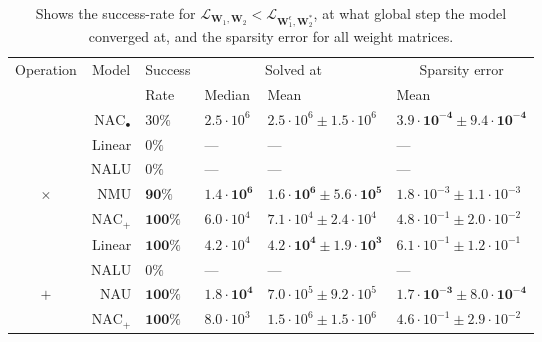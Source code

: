 \begin{table}[H]

\caption{\label{tab:function-task-static-defaults}Shows the success-rate for $\mathcal{L}_{\mathbf{W}_1, \mathbf{W}_2} < \mathcal{L}_{\mathbf{W}_1^\epsilon, \mathbf{W}_2^*}$, at what global step the model converged at, and the sparsity error for all weight matrices.}
\centering
\begin{tabular}{crllll}
\toprule
\multicolumn{1}{c}{Operation} & \multicolumn{1}{c}{Model} & \multicolumn{1}{c}{Success} & \multicolumn{2}{c}{Solved at} & \multicolumn{1}{c}{Sparsity error} \\
\cmidrule(l{3pt}r{3pt}){1-1} \cmidrule(l{3pt}r{3pt}){2-2} \cmidrule(l{3pt}r{3pt}){3-3} \cmidrule(l{3pt}r{3pt}){4-5} \cmidrule(l{3pt}r{3pt}){6-6}
 &  & Rate & Median & Mean & Mean\\
\midrule
 & $\mathrm{NAC}_{\bullet}$ & $30\%$ & $2.5 \cdot 10^{6}$ & $2.5 \cdot 10^{6} \pm 1.5 \cdot 10^{6}$ & $\mathbf{3.9 \cdot 10^{-4} \pm 9.4 \cdot 10^{-4}}$\\

 & Linear & $0\%$ & --- & --- & ---\\

 & NALU & $0\%$ & --- & --- & ---\\

\multirow{-4}{*}{\centering\arraybackslash $\bm{\times}$} & NMU & $\mathbf{90\%}$ & $\mathbf{1.4 \cdot 10^{6}}$ & $\mathbf{1.6 \cdot 10^{6} \pm 5.6 \cdot 10^{5}}$ & $1.8 \cdot 10^{-3} \pm 1.1 \cdot 10^{-3}$\\
\cmidrule{1-6}
 & $\mathrm{NAC}_{+}$ & $\mathbf{100\%}$ & $6.0 \cdot 10^{4}$ & $7.1 \cdot 10^{4} \pm 2.4 \cdot 10^{4}$ & $4.8 \cdot 10^{-1} \pm 2.0 \cdot 10^{-2}$\\

 & Linear & $\mathbf{100\%}$ & $4.2 \cdot 10^{4}$ & $\mathbf{4.2 \cdot 10^{4} \pm 1.9 \cdot 10^{3}}$ & $6.1 \cdot 10^{-1} \pm 1.2 \cdot 10^{-1}$\\

 & NALU & $0\%$ & --- & --- & ---\\

\multirow{-4}{*}{\centering\arraybackslash $\bm{+}$} & NAU & $\mathbf{100\%}$ & $\mathbf{1.8 \cdot 10^{4}}$ & $7.0 \cdot 10^{5} \pm 9.2 \cdot 10^{5}$ & $\mathbf{1.7 \cdot 10^{-3} \pm 8.0 \cdot 10^{-4}}$\\
\cmidrule{1-6}
 & $\mathrm{NAC}_{+}$ & $\mathbf{100\%}$ & $8.0 \cdot 10^{3}$ & $1.5 \cdot 10^{6} \pm 1.5 \cdot 10^{6}$ & $4.6 \cdot 10^{-1} \pm 2.9 \cdot 10^{-2}$\\


\end{tabular}
\end{table}
